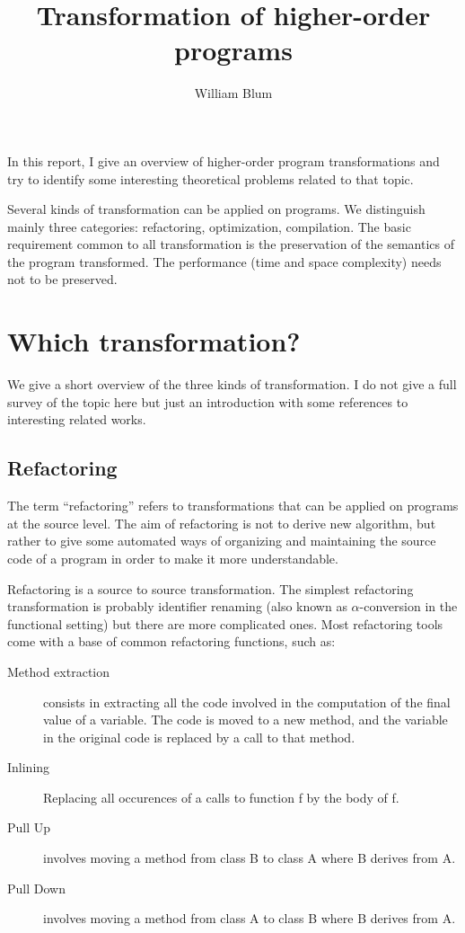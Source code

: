\documentclass[10pt,twocolumn]{article}
\title{Transformation of higher-order programs}
\author{William Blum}
\begin{document}
\maketitle

In this report, I give an overview of higher-order program
transformations and try to identify some interesting theoretical
problems related to that topic.

Several kinds of transformation can be applied on programs. We
distinguish mainly three categories: refactoring, optimization,
compilation. The basic requirement common to all transformation is
the preservation of the semantics of the program transformed. The
performance (time and space complexity) needs not to be preserved.

\section{Which transformation?}

We give a short overview of the three kinds of transformation. I do not give a full survey of the topic here but just an introduction with some references to interesting related works.

\subsection{Refactoring}

The term ``refactoring'' refers to transformations that can be
applied on programs at the source level. The aim of refactoring is
not to derive new algorithm, but rather to give some automated ways
of organizing and maintaining the source code of a program in order to make it more
understandable.

Refactoring is a source to source transformation. The simplest refactoring transformation is probably
identifier renaming (also known as $\alpha$-conversion in the
functional setting) but there are more complicated ones. Most
refactoring tools come with a base of common refactoring functions,
such as:

\begin{description}
\item [Method extraction] consists in extracting all the code involved in the
computation of the final value of a variable. The code is moved to
a new method, and the variable in the original code is replaced by a
call to that method.
\item[Inlining] Replacing all occurences of a calls to function f by the body of f.
\item[Pull Up] involves moving a method from class B to class A where B derives from A.
\item[Pull Down] involves moving a method from class A to class B where B derives from A.
\end{description}
\end{document}
